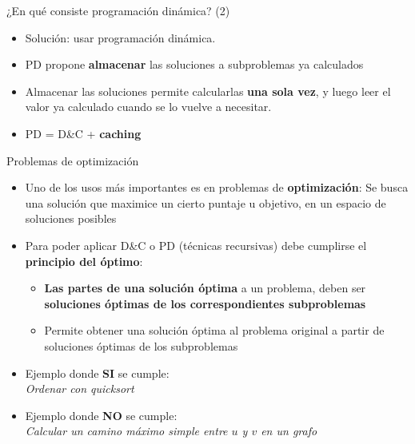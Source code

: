 \documentclass{beamer}
\begin{document}
\begin{frame}{¿En qué consiste programación dinámica? (2)}
  \begin{itemize}
   \item Solución: usar programación dinámica.
   \item PD propone \textbf{almacenar} las soluciones a subproblemas ya calculados
   \item Almacenar las soluciones permite calcularlas \textbf{una sola vez}, y luego leer el valor ya calculado cuando se lo vuelve a necesitar.
   \item PD = D\&C + \textbf{caching}
  \end{itemize}
    
\end{frame}

\begin{frame}{Problemas de optimización}
    \begin{itemize}
        \item Uno de los usos más importantes es en problemas de \textbf{optimización}: Se busca una solución que maximice un cierto puntaje u objetivo, en un espacio de soluciones posibles
        \item Para poder aplicar D\&C o PD (técnicas recursivas) debe cumplirse el \textbf{principio del óptimo}: 
        \begin{itemize}
            \item \textbf{Las partes de una solución óptima} a un problema, deben ser \textbf{soluciones óptimas de los correspondientes subproblemas}
            \item Permite obtener una solución óptima al problema original a partir de soluciones óptimas de los subproblemas
        \end{itemize}
        \item Ejemplo donde \textbf{SI} se cumple: \\ \textit{Ordenar con quicksort}
        \item Ejemplo donde \textbf{NO} se cumple: \\ \textit{Calcular un camino máximo simple entre $u$ y $v$ en un grafo}
    \end{itemize}
\end{frame}
\end{document}
